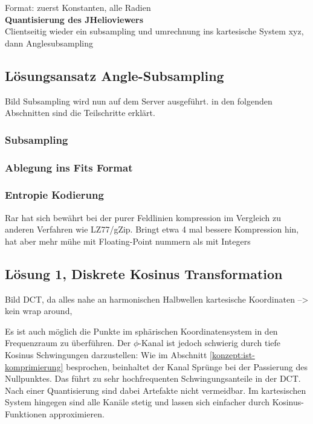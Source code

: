 Format: zuerst Konstanten, alle Radien\\
[\baselineskip]
\textbf{Quantisierung des JHelioviewers}\\
Clientseitig wieder ein subsampling und umrechnung ins kartesische System xyz, dann Anglesubsampling
	
\subsection{Lösungsansatz Angle-Subsampling}
Bild
Subsampling wird nun auf dem Server ausgeführt. in den folgenden Abschnitten sind die Teilschritte erklärt.

\subsubsection{Subsampling}\label{konzept:loesung0:subsampling}

\subsubsection{Ablegung ins Fits Format} \label{konzept:loesung0:fits}

\subsubsection{Entropie Kodierung} \label{konzept:loesung0:kodierung}
Rar hat sich bewährt bei der purer Feldlinien kompression im Vergleich zu anderen Verfahren wie LZ77/gZip. Bringt etwa 4 mal bessere Kompression hin, hat aber mehr mühe mit Floating-Point nummern als mit Integers

\subsection{Lösung 1, Diskrete Kosinus Transformation}
Bild
DCT, da alles nahe an harmonischen Halbwellen
kartesische Koordinaten --> kein wrap around,

Es ist auch möglich die Punkte im sphärischen Koordinatensystem in den Frequenzraum zu überführen. Der $\phi$-Kanal ist jedoch schwierig durch tiefe Kosinus Schwingungen darzustellen: Wie im Abschnitt \ref{konzept:ist-komprimierung} besprochen, beinhaltet der Kanal Sprünge bei der Passierung des Nullpunktes. Das führt zu sehr hochfrequenten Schwingungsanteile in der DCT. Nach einer Quantisierung sind dabei Artefakte nicht vermeidbar. Im kartesischen System hingegen sind alle Kanäle stetig und lassen sich einfacher durch Kosinus-Funktionen approximieren.\\

